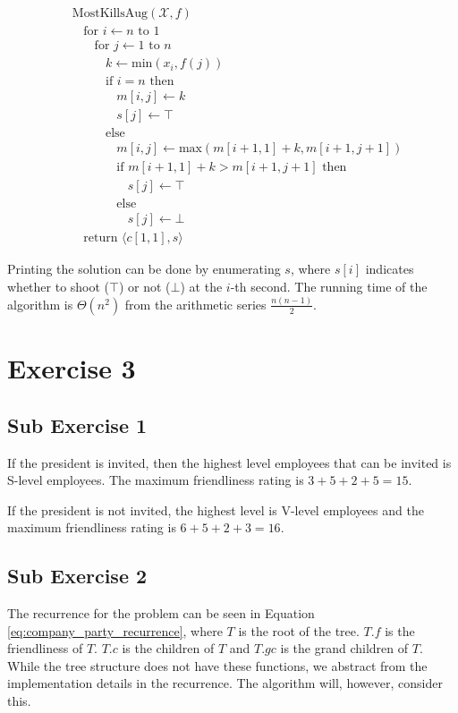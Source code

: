 \documentclass[koma,a4paper]{article}
\begin{document}
\begin{align*}
  &\text{MostKillsAug}(\mathcal{X}, f)\\
  &~~~~\text{for } i \leftarrow n \text{ to } 1\\
  &~~~~~~~~\text{for } j \leftarrow 1 \text{ to } n\\
  &~~~~~~~~~~~~k \leftarrow \text{min}(x_i, f(j))\\
  &~~~~~~~~~~~~\text{if } i = n \text{ then}\\
  &~~~~~~~~~~~~~~~~m[i, j] \leftarrow k\\
  &~~~~~~~~~~~~~~~~s[j] \leftarrow \top\\
  &~~~~~~~~~~~~\text{else }\\
  &~~~~~~~~~~~~~~~~m[i, j] \leftarrow \text{max}(m[i + 1, 1] + k, m[i + 1, j + 1])\\
  &~~~~~~~~~~~~~~~~\text{if } m[i + 1, 1] + k > m[i + 1, j + 1] \text{ then}\\
  &~~~~~~~~~~~~~~~~~~~~s[j] \leftarrow \top\\
  &~~~~~~~~~~~~~~~~\text{else}\\
  &~~~~~~~~~~~~~~~~~~~~s[j] \leftarrow \bot\\
  &~~~~\text{return } \langle c[1, 1], s \rangle
\end{align*}

Printing the solution can be done by enumerating $s$, where $s[i]$ indicates whether to shoot ($\top$) or not ($\bot$) at the $i$-th second. The running time of the algorithm is $\Theta(n^2)$ from the arithmetic series $\frac{n(n - 1)}{2}$.

\section{Exercise 3}
\subsection{Sub Exercise 1}
If the president is invited, then the highest level employees that can be invited is S-level employees. The maximum friendliness rating is $3 + 5 + 2 + 5 = 15$.

If the president is not invited, the highest level is V-level employees and the maximum friendliness rating is $6 + 5 + 2 + 3 = 16$.

\subsection{Sub Exercise 2}
The recurrence for the problem can be seen in Equation \ref{eq:company_party_recurrence}, where $T$ is the root of the tree. $T.f$ is the friendliness of $T$. $T.c$ is the children of $T$ and $T.\mathit{gc}$ is the grand children of $T$. While the tree structure does not have these functions, we abstract from the implementation details in the recurrence. The algorithm will, however, consider this.
\end{document}
